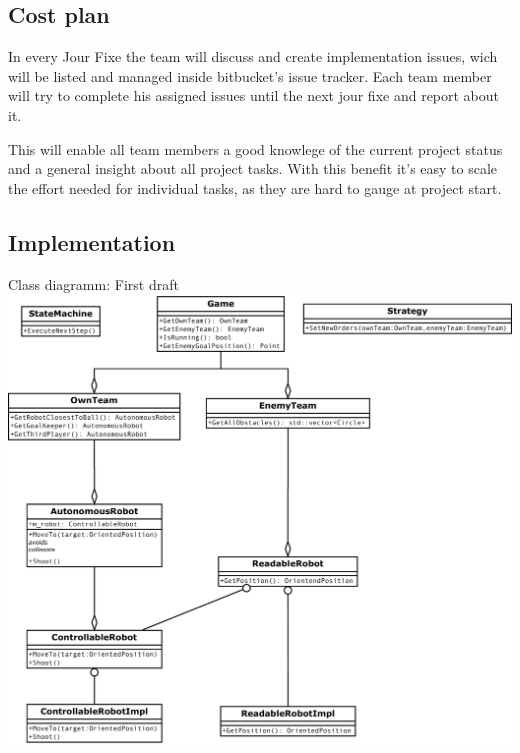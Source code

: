 \documentclass[12pt]{article}
\begin{document}
\subsection{Cost plan}
In every Jour Fixe the team will discuss and create implementation issues, wich will be listed and managed inside bitbucket's issue tracker. 
Each team member will try to complete his assigned issues until the next jour fixe and report about it.

This will enable all team members a good knowlege of the current project status and a general insight about all project tasks. With this benefit it's easy to scale the effort needed for individual tasks, as they are hard to gauge at project start.

\subsection{Implementation}
Class diagramm: First draft\\
\includegraphics[width=\textwidth]{../architecture.pdf}
\end{document}
